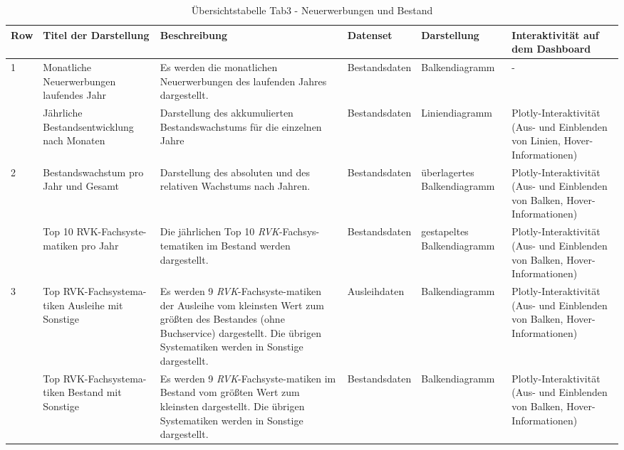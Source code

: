     \begin{table}[H]
        \LARGE
        \centering
        \begin{adjustbox}{max width=\textwidth}
        \begin{tabular}{p{}p{}p{}p{}p{}p{}}
           \toprule
           Row        &Titel der Darstellung&Beschreibung &Datenset &Darstellung &Interaktivität auf dem Dashboard\\
           \midrule
            1           &Monatliche Neuerwerbungen laufendes Jahr&Es werden die monatlichen Neuerwerbungen des laufenden Jahres dargestellt.&Bestandsdaten&Balkendiagramm&-\\
                        &Jährliche Bestandsentwicklung nach Monaten&Darstellung des akkumulierten Bestandswachstums für die einzelnen Jahre&Bestandsdaten&Liniendiagramm    &Plotly-Interaktivität (Aus- und Einblenden von Linien, Hover-Informationen)\\          
            \midrule
            2           &Bestandswachstum pro Jahr und Gesamt&Darstellung des absoluten und des relativen Wachstums nach Jahren.&Bestandsdaten&überlagertes Balkendiagramm&Plotly-Interaktivität (Aus- und Einblenden von Balken, Hover-Informationen)\\
                        &Top 10 RVK-Fachsyste-matiken pro Jahr&Die jährlichen Top 10 \textit{\acrshort{RVK}}-Fachsys-tematiken im Bestand werden dargestellt.&Bestandsdaten    &gestapeltes Balkendiagramm&Plotly-Interaktivität (Aus- und Einblenden von Balken, Hover-Informationen)\\
            \midrule
            3           &Top RVK-Fachsystema-tiken Ausleihe mit Sonstige&Es werden 9 \textit{\acrshort{RVK}}-Fachsyste-matiken der Ausleihe vom kleinsten Wert zum größten des Bestandes (ohne Buchservice) dargestellt. Die übrigen Systematiken werden in Sonstige dargestellt.&Ausleihdaten&Balkendiagramm&Plotly-Interaktivität (Aus- und Einblenden von Balken, Hover-Informationen)\\
                        &Top RVK-Fachsystema-tiken Bestand mit Sonstige&Es werden  9 \textit{\acrshort{RVK}}-Fachsyste-matiken im Bestand vom größten Wert zum kleinsten dargestellt. Die übrigen Systematiken werden in Sonstige dargestellt.&Bestandsdaten&Balkendiagramm&Plotly-Interaktivität (Aus- und Einblenden von Balken, Hover-Informationen)\\

        \bottomrule
        \end{tabular}
        \end{adjustbox}
        \caption{%
            Übersichtstabelle Tab3 - Neuerwerbungen und Bestand
        }
        \label{tab:Darstellung Tab Neuerwerbungen und Bestand}
        \end{table}
    \endgroup

